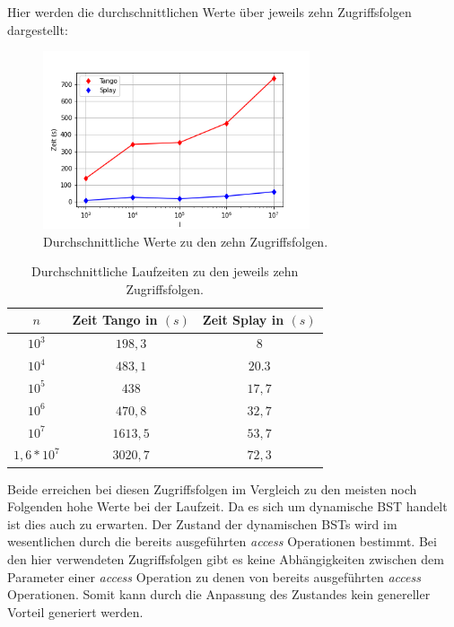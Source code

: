 \documentclass[a4paper,12pt]{article}
\begin{document}
\noindent Hier werden die durchschnittlichen Werte über jeweils zehn Zugriffsfolgen dargestellt:
\begin{figure}[H]
	\centering
	\includegraphics[width=0.7\textwidth]{Medien/laufzeittest/diagramm/randomaccess}
	\caption{Durchschnittliche Werte zu den zehn Zugriffsfolgen.}
	
\end{figure}
\begin{table}[H]
	\begin{center}
		\begin{tabular}[c]{|c|c|c|}
			\hline
			$n$ & Zeit Tango in $\left(s\right)$ &Zeit Splay in $\left(s\right)$ \\
			\hline
			$10^3$ & $198,3$ &$8$ \\
			\hline
			$10^4$  & $483,1$ &$20.3$  \\
			\hline
			$10^5$  & $438$ &$17,7$  \\
			\hline
			$10^6$  & $470,8$ &$32,7$  \\
			\hline
			$10^7$  & $1613,5$ &$53,7$  \\
			\hline
			$1,6 * 10^7$  & $3020,7$ &$72,3$  \\
			\hline
		\end{tabular}
		\caption{Durchschnittliche Laufzeiten zu den jeweils zehn Zugriffsfolgen.} 
	\end{center}
\end{table}
\noindent Beide erreichen bei diesen Zugriffsfolgen im Vergleich zu den meisten noch Folgenden hohe Werte bei der Laufzeit. Da es sich um dynamische BST handelt ist dies auch zu erwarten. Der Zustand der dynamischen BSTs wird im wesentlichen durch  die  bereits ausgeführten \textit{access} Operationen bestimmt. Bei den hier verwendeten Zugriffsfolgen gibt es keine Abhängigkeiten zwischen dem Parameter einer \textit{access} Operation zu denen von bereits ausgeführten \textit{access} Operationen. Somit kann durch die Anpassung des Zustandes kein genereller Vorteil generiert werden.\\
\end{document}
